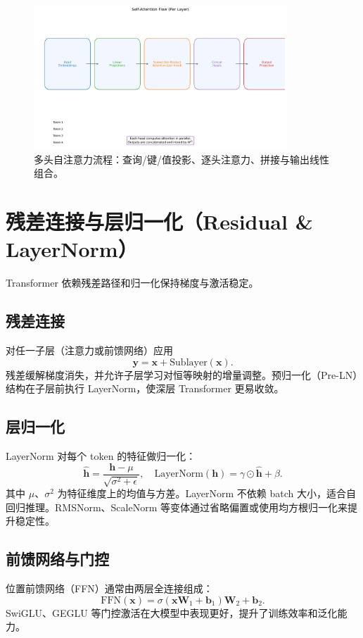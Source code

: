 \documentclass[UTF8,zihao=-4]{ctexart}
\begin{document}
\begin{figure}[H]
  \centering
  \includegraphics[width=0.85\textwidth]{self_attention_flow.png}
  \caption{多头自注意力流程：查询/键/值投影、逐头注意力、拼接与输出线性组合。}
  \label{fig:self_attention_flow_cn}
\end{figure}
\FloatBarrier

\section{残差连接与层归一化（Residual \& LayerNorm）}
Transformer 依赖残差路径和归一化保持梯度与激活稳定。

\subsection{残差连接}
对任一子层（注意力或前馈网络）应用
\begin{equation}
  \mathbf{y} = \mathbf{x} + \mathrm{Sublayer}(\mathbf{x}).
\end{equation}
残差缓解梯度消失，并允许子层学习对恒等映射的增量调整。预归一化（Pre-LN）结构在子层前执行 LayerNorm，使深层 Transformer 更易收敛。

\subsection{层归一化}
LayerNorm 对每个 token 的特征做归一化：
\begin{equation}
  \hat{\mathbf{h}} = \frac{\mathbf{h} - \mu}{\sqrt{\sigma^2 + \epsilon}},\quad \mathrm{LayerNorm}(\mathbf{h}) = \gamma \odot \hat{\mathbf{h}} + \beta.
\end{equation}
其中 $\mu$、$\sigma^2$ 为特征维度上的均值与方差。LayerNorm 不依赖 batch 大小，适合自回归推理。RMSNorm、ScaleNorm 等变体通过省略偏置或使用均方根归一化来提升稳定性。

\subsection{前馈网络与门控}
位置前馈网络（FFN）通常由两层全连接组成：
\begin{equation}
  \mathrm{FFN}(\mathbf{x}) = \sigma(\mathbf{x}\mathbf{W}_1 + \mathbf{b}_1)\mathbf{W}_2 + \mathbf{b}_2.
\end{equation}
SwiGLU、GEGLU 等门控激活在大模型中表现更好，提升了训练效率和泛化能力。
\end{document}
